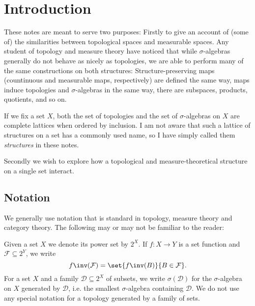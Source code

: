 \documentclass[article, a4paper, 11pt, oneside]{memoir}
\title{\doctitle}
\author{\docauthor}
\numberwithin{equation}{chapter}
\newcommand{\calD}{\mathcal{D}}
\newcommand{\calF}{\mathcal{F}}
\newcommand{\powerset}[1]{2^{#1}}
\begin{document}
\maketitle

\chapter{Introduction}

These notes are meant to serve two purposes: Firstly to give an account of (some of) the similarities between topological spaces and measurable spaces. Any student of topology and measure theory have noticed that while $\sigma$-algebras generally do not behave as nicely as topologies, we are able to perform many of the same constructions on both structures: Structure-preserving maps (countinuous and measurable maps, respectively) are defined the same way, maps induce topologies and $\sigma$-algebras in the same way, there are subspaces, products, quotients, and so on.

If we fix a set $X$, both the set of topologies and the set of $\sigma$-algebras on $X$ are complete lattices when ordered by inclusion. I am not aware that such a lattice of structures on a set has a commonly used name, so I have simply called them \emph{structures} in these notes.

Secondly we wish to explore how a topological and measure-theoretical structure on a single set interact.


\section{Notation}

We generally use notation that is standard in topology, measure theory and category theory. The following may or may not be familiar to the reader:

Given a set $X$ we denote its power set by $\powerset{X}$. If $f \colon X \to Y$ is a set function and $\calF \subseteq \powerset{Y}$, we write
%
\begin{equation*}
    f\inv(\calF)
        = \set{f\inv(B)}{B \in \calF}.
\end{equation*}
%
For a set $X$ and a family $\calD \subseteq \powerset{X}$ of subsets, we write $\sigma(\calD)$ for the $\sigma$-algebra on $X$ generated by $\calD$, i.e. the smallest $\sigma$-algebra containing $\calD$. We do not use any special notation for a topology generated by a family of sets.
\end{document}
